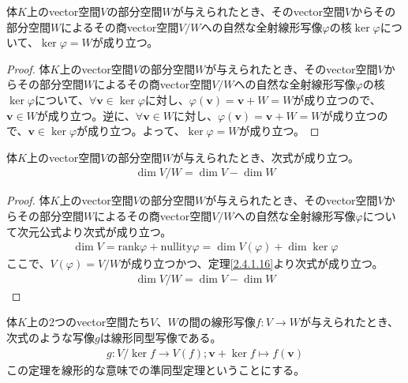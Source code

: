 \documentclass[dvipdfmx]{jsarticle}
\begin{document}
\begin{thm}\label{2.4.1.16}
体$K$上のvector空間$V$の部分空間$W$が与えられたとき、そのvector空間$V$からその部分空間$W$によるその商vector空間${V}/{W}$への自然な全射線形写像$\varphi$の核$\ker\varphi$について、$\ker\varphi = W$が成り立つ。
\end{thm}
\begin{proof}
体$K$上のvector空間$V$の部分空間$W$が与えられたとき、そのvector空間$V$からその部分空間$W$によるその商vector空間${V}/{W}$への自然な全射線形写像$\varphi$の核$\ker\varphi$について、$\forall\mathbf{v} \in \ker\varphi$に対し、$\varphi\left( \mathbf{v} \right) = \mathbf{v} + W = W$が成り立つので、$\mathbf{v} \in W$が成り立つ。逆に、$\forall\mathbf{v} \in W$に対し、$\varphi\left( \mathbf{v} \right) = \mathbf{v} + W = W$が成り立つので、$\mathbf{v} \in \ker\varphi$が成り立つ。よって、$\ker\varphi = W$が成り立つ。
\end{proof}
\begin{thm}\label{2.4.1.17}
体$K$上のvector空間$V$の部分空間$W$が与えられたとき、次式が成り立つ。
\begin{align*}
\dim{V}/{W} = \dim V - \dim W
\end{align*}
\end{thm}
\begin{proof}
体$K$上のvector空間$V$の部分空間$W$が与えられたとき、そのvector空間$V$からその部分空間$W$によるその商vector空間${V}/{W}$への自然な全射線形写像$\varphi$について次元公式より次式が成り立つ。
\begin{align*}
\dim V = {\mathrm{rank}}\varphi + {\mathrm{nullity}}\varphi = \dim{V(\varphi)} + \dim{\ker\varphi}
\end{align*}
ここで、$V(\varphi) = {V}/{W}$が成り立つかつ、定理\ref{2.4.1.16}より次式が成り立つ。
\begin{align*}
\dim{V}/{W} = \dim V - \dim W
\end{align*}
\end{proof}
\begin{thm}[線形的な意味での準同型定理]\label{2.4.1.18}
体$K$上の2つのvector空間たち$V$、$W$の間の線形写像$f:V \rightarrow W$が与えられたとき、次式のような写像$g$は線形同型写像である。
\begin{align*}
g:{V}/{\ker f} \rightarrow V(f);\mathbf{v} + \ker f \mapsto f\left( \mathbf{v} \right)
\end{align*}
この定理を線形的な意味での準同型定理ということにする。
\end{thm}
\end{document}

